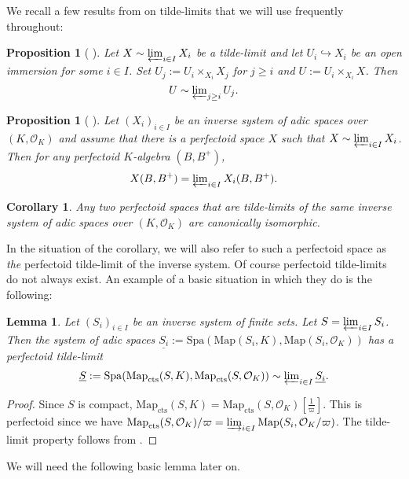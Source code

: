 \documentclass[10pt,oneside]{amsart}
\newtheorem{lemma}[theorem]{Lemma}
\newtheorem{proposition}[theorem]{Proposition}
\newtheorem{corollary}[theorem]{Corollary}
\theoremstyle{definition}
\renewcommand{\O}{\mathcal{O}}
\begin{document}
We recall a few results from \cite[\S2.4]{SW}  on tilde-limits that we will use frequently throughout:

\begin{proposition}[{\cite[Proposition 2.4.3]{SW}} ]\label{SW Proposition 2.4.3}
	Let $X\sim \varprojlim_{i\in I} X_i$ be a tilde-limit and let $U_i\hookrightarrow X_i$ be an open immersion for some $i\in I$. Set $U_j:=U_i\times_{X_i}X_j$ for $j\geq i$ and $U:=U_i\times_{X_i}X$. Then 
	\[U\sim \textstyle\varprojlim_{j\geq i} U_j.\]
\end{proposition}

\begin{proposition}[{\cite[Proposition 2.4.5]{SW}} ]\label{SW Proposition 2.4.5}
	Let $(X_i)_{i\in I}$ be an inverse system of adic spaces over $(K,\mathcal O_K)$ and assume that there is a perfectoid space $X$ such that $X\sim \varprojlim_{i\in I} X_i$. Then for any perfectoid $K$-algebra $(B,B^{+})$, 
	\[X(B,B^{+})  = \textstyle\varprojlim_{i\in I}X_i(B,B^{+}).\]
\end{proposition}
\begin{corollary}\label{corollary: perfectoid tilde limit is unique}
	Any two perfectoid spaces that are tilde-limits of the same inverse system of adic spaces over $(K,\mathcal O_K)$ are canonically isomorphic.
\end{corollary}
In the situation of the corollary, we will also refer to such a perfectoid space as \textit{the} perfectoid tilde-limit of the inverse system. Of course perfectoid tilde-limits do not always exist. An example of a basic situation in which they do is the following:
\begin{lemma}\label{l:pro-finite-perfectoid-spaces}
	Let $(S_i)_{i\in I}$ be an inverse system of finite sets. Let $S=\varprojlim_{i\in I} S_i$. Then the system of adic spaces $\underline{S_i}:=\mathrm{Spa}(\mathrm{Map}(S_i,K),\mathrm{Map}(S_i,\O_K))$ has a perfectoid tilde-limit	\[\underline{S}:=\mathrm{Spa}(\mathrm{Map}_{\mathrm{cts}}(S,K),\mathrm{Map}_{\mathrm{cts}}(S,\O_K))\sim\textstyle\varprojlim_{i\in I} \underline{S_i}.\]
\end{lemma}
\begin{proof}
	Since $S$ is compact, $\mathrm{Map}_{\mathrm{cts}}(S,K)=\mathrm{Map}_{\mathrm{cts}}(S,\O_K)[\tfrac{1}{\varpi}]$. This is perfectoid since we have $\mathrm{Map}_{\mathrm{cts}}(S,\O_K)/\varpi=\varinjlim_{i\in I}\mathrm{Map}(S_i,\O_K/\varpi)$. The tilde-limit property follows from \cite[Proposition 2.4.2]{SW}.
\end{proof}
We will need the following basic lemma later on.
\end{document}

